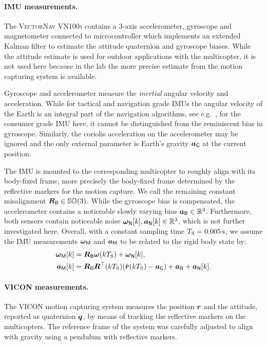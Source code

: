 \paragraph{IMU measurements.}
The \textsc{VectorNav VN100s} contains a 3-axis accelerometer, gyroscope and magnetometer connected to microcontroller which implements an extended Kalman filter to estimate the attitude quaternion and gyroscope biases.
While the attitude estimate is used for outdoor applications with the multicopter, it is not used here because in the lab the more precise estimate from the motion capturing system is available.

Gyroscope and accelerometer measure the \textit{inertial} angular velocity and acceleration.
While for tactical and navigation grade IMUs the angular velocity of the Earth is an integral part of the navigation algorithms, see e.g.\ \cite{Savage:Strapdown1}, for the consumer grade IMU here, it cannot be distinguished from the reminiscent bias in gyroscope.
Similarly, the coriolis acceleration on the accelerometer may be ignored and the only external parameter is Earth's gravity $\boldsymbol{a}_{\mathsf{G}}$ at the current position.

The IMU is mounted to the corresponding multicopter to roughly align with its body-fixed frame, more precisely the body-fixed frame determined by the reflective markers for the motion capture.
We call the remaining constant misalignment $\boldsymbol{R}_{\mathsf{B}} \in \mathbb{SO}(3)$.
While the gyroscope bias is compensated, the accelerometer contains a noticeable slowly varying bias $\boldsymbol{a}_{\mathsf{B}} \in \mathbb{R}^3$.
Furthermore, both sensors contain noticeable noise $\boldsymbol{\omega}_{\mathsf{N}}[k], \boldsymbol{a}_{\mathsf{N}}[k] \in \mathbb{R}^3$, which is not further investigated here.
Overall, with a constant sampling time $T_{\mathrm{S}}=0.005\,\text{s}$, we assume the IMU measurements $\boldsymbol{\omega}_{\mathsf{M}}$ and $\boldsymbol{a}_{\mathsf{M}}$ to be related to the rigid body state by:
\begin{align}\label{eq:RealizationImuModel}
 \boldsymbol{\omega}_{\mathsf{M}}[k] &= \boldsymbol{R}_{\mathsf{B}} \boldsymbol{\omega}(kT_{\mathrm{S}}) + \boldsymbol{\omega}_{\mathsf{N}}[k],
\\
 \boldsymbol{a}_{\mathsf{M}}[k] &=  \boldsymbol{R}_{\mathsf{B}} \boldsymbol{R}^\top(kT_{\mathrm{S}}) (\ddot{\boldsymbol{r}}(kT_{\mathrm{S}}) - \boldsymbol{a}_{\mathsf{G}}) + \boldsymbol{a}_{\mathsf{B}} + \boldsymbol{a}_{\mathsf{N}}[k]
 .
\end{align}

\paragraph{VICON measurements.}
The \textsc{VICON} motion capturing system measures the position $\boldsymbol{r}$ and the attitude, reported as quaternion $\boldsymbol{q}$, by means of tracking the reflective markers on the multicopters.
The reference frame of the system was carefully adjusted to align with gravity using a pendulum with reflective markers.

